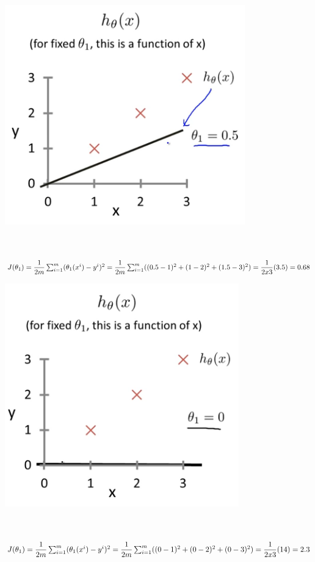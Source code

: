 \documentclass[12pt]{article}
\begin{document}
\begin{itemize}
    \begin{center}
    \includegraphics[scale=0.5]{Example2.png}
    \end{center}
    \\\\
    $J(\theta_1)  = \dfrac{1}{2m} \sum_{i=1}^{m} (\theta_1(x^i) - y^i)^2\\ 
                  = \dfrac{1}{2m} \sum_{i=1}^{m} ((0.5-1)^2 + (1-2)^2 + (1.5-3)^2)\\ \\
                  = \dfrac{1}{2x3} (3.5) \\ \\
                  = 0.68$
    \begin{center}
    \includegraphics[scale=0.5]{Example3.png}
    \end{center}
    \\\\
    $J(\theta_1)  = \dfrac{1}{2m} \sum_{i=1}^{m} (\theta_1(x^i) - y^i)^2\\ 
                  = \dfrac{1}{2m} \sum_{i=1}^{m} ((0-1)^2 + (0-2)^2 + (0-3)^2)\\ \\
                  = \dfrac{1}{2x3} (14) \\ \\
                  = 2.3$\\


\end{itemize}
\end{document}
